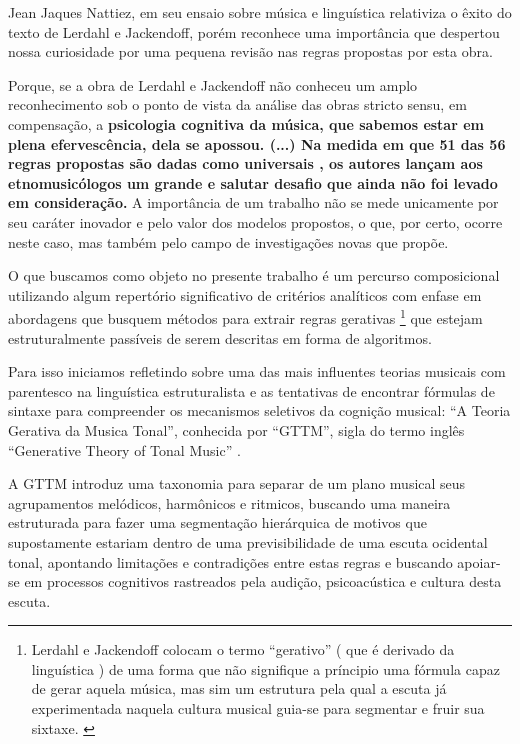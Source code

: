 \documentclass[
	12pt,				%
	openright,			%
	twoside,			%
	a4paper,			%
	english,			%
	french,				%
	spanish,			%
	brazil				%
	]{abntex2}
\begin{document}
Jean Jaques Nattiez, em seu ensaio sobre música e linguística \cite{nattiez2004modelos} relativiza o êxito do texto de Lerdahl e Jackendoff, porém reconhece uma importância  que despertou nossa curiosidade por uma pequena revisão nas regras propostas por esta obra.

\begin{citacao}
Porque, se a obra de Lerdahl e Jackendoff não conheceu um amplo reconhecimento sob o ponto de vista da análise das obras stricto sensu, em compensação, a \textbf{psicologia cognitiva da música, que sabemos estar em plena efervescência, dela se apossou. (...) Na medida em que 51 das 56 regras propostas são dadas como universais \cite[ p.345-352]{lerdahl1983generative}, os autores lançam aos etnomusicólogos um grande e salutar desafio que ainda não foi levado em consideração.} A importância de um trabalho não se mede unicamente por seu caráter inovador e pelo valor dos modelos propostos, o que, por certo, ocorre neste caso, mas também pelo campo de investigações novas que propõe.
\cite[ grifos nossos.]{nattiez2004modelos}
\end{citacao}


O que buscamos como objeto no presente trabalho é um percurso composicional utilizando algum repertório significativo de critérios analíticos com enfase em abordagens que busquem métodos para extrair regras gerativas
\footnote{
Lerdahl e Jackendoff colocam o termo “gerativo” ( que é derivado da linguística ) de uma forma que não signifique a príncipio uma fórmula capaz de gerar aquela música, mas sim um estrutura pela qual a escuta já experimentada naquela cultura musical guia-se para segmentar e fruir sua sixtaxe. \cite[ p.6]{lerdahl1983generative}
}
que estejam estruturalmente passíveis de serem descritas em forma de algoritmos. 

Para isso iniciamos refletindo sobre uma das mais influentes teorias musicais com parentesco na linguística estruturalista e as tentativas de encontrar fórmulas de sintaxe para compreender os mecanismos seletivos da cognição musical: “A Teoria Gerativa da Musica Tonal”, conhecida por “GTTM”, sigla do termo inglês “Generative Theory of Tonal Music” \cite{lerdahl1983generative}.

A GTTM introduz uma taxonomia para separar de um plano musical seus agrupamentos melódicos, harmônicos e ritmicos, buscando uma maneira estruturada para fazer uma segmentação hierárquica de motivos que supostamente estariam dentro de uma previsibilidade de uma escuta ocidental tonal, apontando limitações e contradições entre estas regras e buscando apoiar-se em processos cognitivos rastreados pela audição, psicoacústica e cultura desta escuta. 
\end{document}
